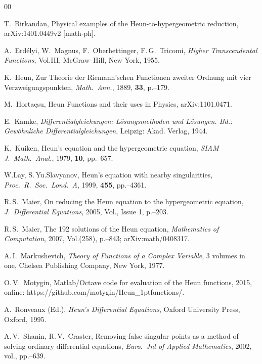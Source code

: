 \documentclass[11pt]{article}
\begin{document}
\begin{thebibliography}{00}

 T.\ Birkandan, Physical examples of the
Heun-to-hypergeometric reduction, arXiv:1401.0449v2 [math-ph].

 A.\ Erd\'{e}lyi, W.\ Magnus, F.\ Oberhettinger, F.\,G.\
Tricomi, \emph{Higher Transcendental Functions}, Vol.\;III, McGraw--Hill, New
York, 1955.

 K.\ Heun, Zur Theorie der Riemann'schen Functionen zweiter
Ordnung mit vier Verzweigungs\-punkten, \textit{Math.\ Ann.}, 1889, \textbf{33},
p.\;161--179.

 M.\ Horta\c{c}su, Heun Functions and their uses in Physics,
arXiv:1101.0471.

 E.\ Kamke, \emph{Differentialgleichungen: L\"osungsmethoden
und L\"osungen. Bd.\;1: Gew\"ohnliche Dif\-fe\-ren\-ti\-al\-glei\-chungen},
Leipzig: Akad. Verlag, 1944.

 K.\ Kuiken, Heun's equation and the hypergeometric equation,
\textit{SIAM J.\ Math.\ Anal.}, 1979, \textbf{10}, pp.\;655--657.

 W.\;Lay, S.\,Yu.\;Slavyanov, Heun's equation with
nearby singularities, \textit{Proc.\ R.\ Soc.\ Lond.\ A}, 1999, \textbf{455},
pp.\;4347--4361.

 R.\,S.\ Maier, On reducing the Heun equation to the
hypergeometric equation, \textit{J.~Differential Equations}, 2005, Vol.,
Issue 1, p.\;171--203.

 R.\,S.\ Maier, The 192 solutions of the Heun equation,
\textit{Mathematics of Computation}, 2007, Vol.\;76(258), p.\;811--843;
arXiv:math/0408317.

 A.\,I.\ Markushevich, \emph{Theory of Functions of a
Complex Variable}, 3 volumes in one, Chelsea Publishing Company, New York, 1977.

 O.\,V.\ Motygin, Matlab/Octave code for evaluation of the Heun
functions, 2015, online:
https://github.com/motygin/Heun{\LARGE\_}\kern1ptfunctions/.

 A.\ Ronveaux (Ed.), \emph{Heun's Differential
Equations}, Oxford University Press, Oxford, 1995.

 A.\,V.\ Shanin, R.\,V.\ Craster, Removing false
singular points as a method of solving ordinary differential equations,
\textit{Euro.\ Jnl of Applied Mathematics}, 2002, vol.\;13, pp.\;617--639.


\end{thebibliography}
\end{document}
